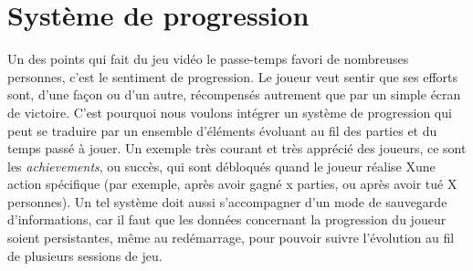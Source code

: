 \documentclass[../doc.tex]{subfiles}
\begin{document}
\section{Système de progression}
Un des points qui fait du jeu vidéo le passe-temps
favori de nombreuses personnes, c'est le sentiment de
progression. Le joueur veut sentir que ses efforts sont,
d'une façon ou d'un autre, récompensés autrement que par un
simple écran de victoire. C'est pourquoi nous voulons intégrer
un système de progression qui peut se traduire par un ensemble
d'éléments évoluant au fil des parties et du temps passé à jouer.
\newline\indent
Un exemple très courant et très apprécié des joueurs, ce sont les
\textit{achievements}, ou succès, qui sont débloqués quand le joueur réalise
Xune action spécifique (par exemple, après avoir gagné x parties,
ou après avoir tué X personnes). Un tel système doit aussi s'accompagner d'un mode de sauvegarde d'informations,
car il faut que les données concernant la progression du joueur
soient persistantes, même au redémarrage, pour pouvoir suivre l'évolution au fil de plusieurs sessions de jeu.
\end{document}
